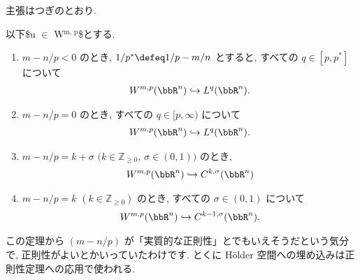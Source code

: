 \documentclass[openany, a4paper, oneside]{jsbook}
\begin{document}
主張はつぎのとおり.
\begin{thm}\label{yukimi-introduction-to-sobolev-embedding-theorems7}
 以下\$u $\in$ W$^{\text{m, p}}$\$とする.
\begin{enumerate}
\item $m - n/p < 0$ のとき, $1/p^{*} \defeq 1/p - m/n$ とすると,
すべての $q\in [p, p^*]$ について
\begin{align}
 W^{m, p}(\bbR^n) \hookrightarrow L^q (\bbR^n).
\end{align}
\item $m - n/p = 0$ のとき, すべての $q\in [p, \infty)$ について
\begin{align}
 W^{m, p}(\bbR^n) \hookrightarrow L^q (\bbR^n).
\end{align}
\item $m - n/p = k + \sigma$ $(k \in \mathbb{Z}_{\ge 0}$, $\sigma \in (0, 1))$ のとき,
\begin{align}
 W^{m, p}(\bbR^n) \hookrightarrow C^{k, \sigma}(\bbR^n)
\end{align}
\item $m - n/p = k$ $(k \in \mathbb{Z}_{\ge 0})$ のとき, すべての $\sigma \in (0, 1)$ について
\begin{align}
 W^{m, p}(\bbR^n) \hookrightarrow C^{k - 1, \sigma}(\bbR^n).
\end{align}
\end{enumerate}
\end{thm}
この定理から $(m - n/p)$ が「実質的な正則性」とでもいえそうだという気分で, 正則性がよいとかいっていたわけです.
とくに H\"older 空間への埋め込みは正則性定理への応用で使われる.
\end{document}
